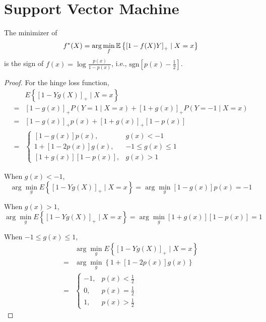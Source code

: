 \chapter{Support Vector Machine}

\begin{theorem}
	The minimizer of
	\begin{equation*}
		f^{*}(X)=\arg\min_{f}\mathbb{E}\left\{\left[1-f(X)Y\right]_{+}\mid X=x\right\}
	\end{equation*}
	is the sign of \(f(x)=\log\frac{p(x)}{1-p(x)}\), i.e., \(\text{sgn}\left[p(x)-\frac{1}{2}\right]\).
\end{theorem}

\begin{proof}
	For the hinge loss function,
	\begin{equation*}
		\begin{aligned}
			  & E\left\{\left[1-Yg(X)\right]_{+}\mid X=x\right\}                                                   \\
			= & \left[1-g(x)\right]_{+}P\left(Y=1\mid X=x\right)+\left[1+g(x)\right]_{+}P\left(Y=-1\mid X=x\right) \\
			= & \left[1-g(x)\right]_{+}p(x)+\left[1+g(x)\right]_{+}\left[1-p(x)\right]                             \\
			= & \left\{\begin{array}{ll}
				           \left[1-g(x)\right]p(x),                & g(x)<-1           \\
				           1+\left[1-2p(x)\right]g(x),             & -1\leq g(x)\leq 1 \\
				           \left[1+g(x)\right]\left[1-p(x)\right], & g(x)>1
			           \end{array}\right.
		\end{aligned}
	\end{equation*}

	When \(g(x)<-1\),
	\begin{equation*}
		\arg\min_{g}E\left\{\left[1-Yg(X)\right]_{+}\mid X=x\right\}=\arg\min_{g}\left[1-g(x)\right]p(x)=-1
	\end{equation*}

	When \(g(x)>1\),
	\begin{equation*}
		\arg\min_{g}E\left\{\left[1-Yg(X)\right]_{+}\mid X=x\right\}=\arg\min_{g}\left[1+g(x)\right]\left[1-p(x)\right]=1
	\end{equation*}

	When \(-1\leq g(x)\leq 1\),
	\begin{equation*}
		\begin{aligned}
			  & \arg\min_{g}E\left\{\left[1-Yg(X)\right]_{+}\mid X=x\right\} \\
			= & \arg\min_{g}\left\{1+\left[1-2p(x)\right]g(x)\right\}        \\
			= & \left\{\begin{array}{ll}
				           -1, & p(x)<\frac{1}{2} \\
				           0,  & p(x)=\frac{1}{2} \\
				           1,  & p(x)>\frac{1}{2}
			           \end{array}\right.
		\end{aligned}
	\end{equation*}


\end{proof}
